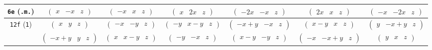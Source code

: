 \documentclass[fleqn,9pt,landscape]{jsarticle}
\begin{document}
\begin{center}
\begin{longtable}{ccccccc}
{\tt 6e} ({\tt .m.}) & $ \begin{pmatrix} x & - x & z \end{pmatrix} $ & $ \begin{pmatrix} - x & x & z \end{pmatrix} $ & $ \begin{pmatrix} x & 2 x & z \end{pmatrix} $ & $ \begin{pmatrix} - 2 x & - x & z \end{pmatrix} $ & $ \begin{pmatrix} 2 x & x & z \end{pmatrix} $ & $ \begin{pmatrix} - x & - 2 x & z \end{pmatrix} $ \\ \hline
{\tt 12f} ({\tt 1}) & $ \begin{pmatrix} x & y & z \end{pmatrix} $ & $ \begin{pmatrix} - x & - y & z \end{pmatrix} $ & $ \begin{pmatrix} - y & x - y & z \end{pmatrix} $ & $ \begin{pmatrix} - x + y & - x & z \end{pmatrix} $ & $ \begin{pmatrix} x - y & x & z \end{pmatrix} $ & $ \begin{pmatrix} y & - x + y & z \end{pmatrix} $ \\
& $ \begin{pmatrix} - x + y & y & z \end{pmatrix} $ & $ \begin{pmatrix} x & x - y & z \end{pmatrix} $ & $ \begin{pmatrix} - y & - x & z \end{pmatrix} $ & $ \begin{pmatrix} x - y & - y & z \end{pmatrix} $ & $ \begin{pmatrix} - x & - x + y & z \end{pmatrix} $ & $ \begin{pmatrix} y & x & z \end{pmatrix} $ \\
\end{longtable}
\end{center}
\end{document}

